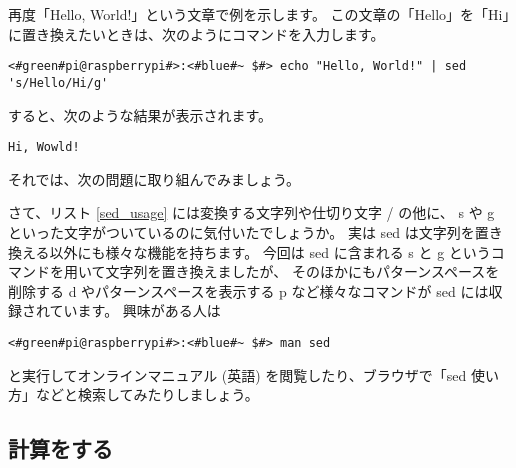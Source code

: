 再度「Hello, World!」という文章で例を示します。
この文章の「Hello」を「Hi」に置き換えたいときは、次のようにコマンドを入力します。

\begin{lstlisting}[caption=sed コマンドを使った例, label=sed_app]
<#green#pi@raspberrypi#>:<#blue#~ $#> echo "Hello, World!" | sed 's/Hello/Hi/g'
\end{lstlisting}

すると、次のような結果が表示されます。

\begin{lstlisting}[caption=sed コマンドで変換した結果, label=sed_result]
Hi, Wowld!
\end{lstlisting}

それでは、次の問題に取り組んでみましょう。

\begin{tcolorbox}[title=\useOmetoi]
\begin{enumerate}
\end{enumerate}
\end{tcolorbox}

さて、リスト \ref{sed_usage} には変換する文字列や仕切り文字 / の他に、
s や g といった文字がついているのに気付いたでしょうか。
実は sed は文字列を置き換える以外にも様々な機能を持ちます。
今回は sed に含まれる s と g というコマンドを用いて文字列を置き換えましたが、
そのほかにもパターンスペースを削除する d やパターンスペースを表示する p など様々なコマンドが sed には収録されています。
興味がある人は

\begin{lstlisting}
<#green#pi@raspberrypi#>:<#blue#~ $#> man sed
\end{lstlisting}

と実行してオンラインマニュアル (英語) を閲覧したり、ブラウザで「sed 使い方」などと検索してみたりしましょう。

\subsection{計算をする}

